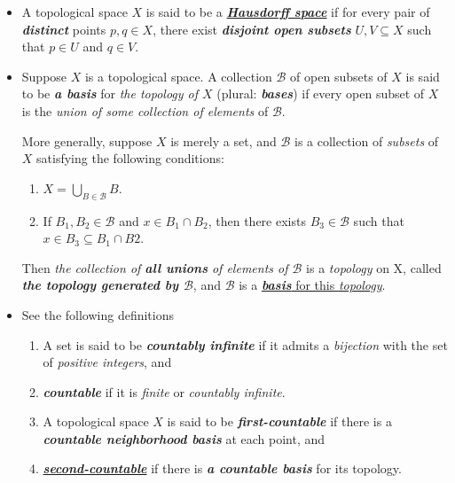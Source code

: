 \documentclass[11pt]{article}
\begin{document}
\begin{itemize}
\item \begin{definition}
A topological space $X$ is said to be a \underline{\emph{\textbf{Hausdorff space}}} if for every pair of \emph{\textbf{distinct}} points $p,q \in X$, there exist \emph{\textbf{disjoint open subsets}} $U,V \subseteq X$ such that $p \in U$ and $q \in V$.
\end{definition}

\item \begin{definition}
Suppose $X$ is a topological space. A collection $\mathscr{B}$ of open subsets of $X$ is said to be \emph{\textbf{a basis}} for \emph{the topology of $X$} (plural: \emph{\textbf{bases}}) if every open subset of $X$ is the \emph{union of some collection of elements} of $\mathscr{B}$.

More generally, suppose $X$ is merely a set, and $\mathscr{B}$ is a collection of \emph{subsets} of $X$ satisfying the following conditions:
\begin{enumerate}
\item $X = \bigcup_{B \in \mathscr{B}}B$.
\item If $B_1, B_2 \in \mathscr{B}$ and $x \in B_1 \cap B_2$, then there exists $B_3 \in \mathscr{B}$ such that $x \in B_3 \subseteq B_1 \cap B2$.
\end{enumerate}
Then \emph{the collection of \textbf{all unions} of elements of $\mathscr{B}$} is a \emph{topology} on X, called \emph{\textbf{the topology generated by $\mathscr{B}$}}, and $\mathscr{B}$ is a \underline{\emph{\textbf{basis}} for this \emph{topology}}.
\end{definition}

\item \begin{definition} See the following definitions
\begin{enumerate}
\item A set is said to be \emph{\textbf{countably infinite}} if it admits a \emph{bijection} with the set of \emph{positive integers}, and 
\item \emph{\textbf{countable}} if it is \emph{finite} or \emph{countably infinite}. 
\item A topological space $X$ is said to be \emph{\textbf{first-countable}} if there is a \emph{\textbf{countable neighborhood basis}} at each point, and 
\item \underline{\emph{\textbf{second-countable}}} if there is \emph{\textbf{a countable basis}} for its topology.
\end{enumerate}
\end{definition}

\end{itemize}
\end{document}
